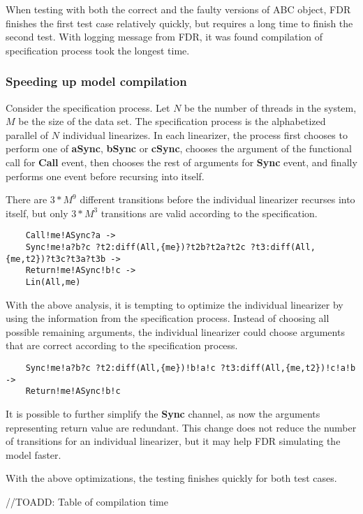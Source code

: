 \documentclass{article}
\begin{document}
When testing with both the correct and the faulty versions of ABC object, FDR finishes the first test case relatively quickly, but requires a long time to finish the second test. With logging message from FDR, it was found compilation of specification process took the longest time. 

\subsubsection{Speeding up model compilation}
Consider the specification process. Let $N$ be the number of threads in the system, $M$ be the size of the data set. The specification process is the alphabetized parallel of $N$ individual linearizes. In each linearizer, the process first chooses to perform one of \textbf{aSync}, \textbf{bSync} or \textbf{cSync}, chooses the argument of the functional call for \textbf{Call} event, then chooses the rest of arguments for \textbf{Sync} event, and finally performs one event before recursing into itself.

There are $3*M^9$ different transitions before the individual linearizer recurses into itself, but only $3*M^3$ transitions are valid according to the specification. 

\begin{verbatim}
    Call!me!ASync?a ->
    Sync!me!a?b?c ?t2:diff(All,{me})?t2b?t2a?t2c ?t3:diff(All,{me,t2})?t3c?t3a?t3b ->
    Return!me!ASync!b!c ->
    Lin(All,me)
\end{verbatim}
    
With the above analysis, it is tempting to optimize the individual linearizer by using the information from the specification process. Instead of choosing all possible remaining arguments, the individual linearizer could choose arguments that are correct according to the specification process.

\begin{verbatim}
    Sync!me!a?b?c ?t2:diff(All,{me})!b!a!c ?t3:diff(All,{me,t2})!c!a!b ->
    Return!me!ASync!b!c
\end{verbatim}
It is possible to further simplify the \textbf{Sync} channel, as now the arguments representing return value are redundant. This change does not reduce the number of transitions for an individual linearizer, but it may help FDR simulating the model faster.

With the above optimizations, the testing finishes quickly for both test cases.

//TOADD: Table of compilation time
\end{document}
